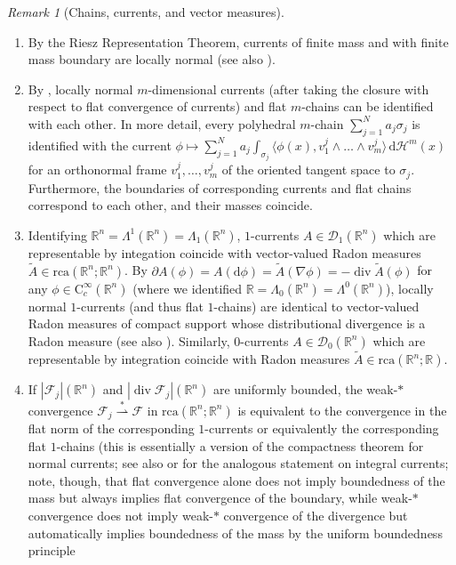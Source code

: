 \documentclass[10pt,a4paper,oneside,final]{article}
\newcommand{\R}{{\mathbb{R}}}
\newcommand{\de}{{\mathrm{d}}}
\DeclareMathOperator{\dv}{div}
\newcommand{\hd}{\mathcal{H}}
\newcommand{\rca}{\mathrm{rca}}
\newcommand{\currents}[1]{{\mathcal{D}_{#1}}}
\newcommand{\weakstarto}{\stackrel{*}{\rightharpoonup}}
\newcommand{\cont}{{\mathrm{C}}}
\newcommand{\contsmooth}{\cont_{c}^{\infty}}
\newcommand{\flux}{{\mathcal{F}}}
\numberwithin{equation}{section}
\theoremstyle{plain}
\theoremstyle{definition}
\theoremstyle{remark}
\newtheorem{remark}[theorem]{Remark}
\begin{document}
\begin{remark}[Chains, currents, and vector measures]\label{rem:chainsRCA}\mbox{}
\begin{enumerate}
\item By the Riesz Representation Theorem, currents of finite mass and with finite mass boundary are locally normal (see also \cite[26.7]{Si83}).
\item By \cite[4.1.23 \& 4.2.23]{Fe69}, locally normal $m$-dimensional currents (after taking the closure with respect to flat convergence of currents) and flat $m$-chains can be identified with each other.
In more detail, every polyhedral $m$-chain $\sum_{j=1}^Na_j\sigma_j$ is identified with the current $\phi\mapsto\sum_{j=1}^Na_j\int_{\sigma_j}\langle\phi(x),v_1^j\wedge\ldots\wedge v_m^j\rangle\,\de\hd^m(x)$
for an orthonormal frame $v_1^j,\ldots,v_m^j$ of the oriented tangent space to $\sigma_j$.
Furthermore, the boundaries of corresponding currents and flat chains correspond to each other, and their masses coincide.
\item Identifying $\R^n=\Lambda^1(\R^n)=\Lambda_1(\R^n)$, $1$-currents $A\in\currents1(\R^n)$ which are representable by integation coincide with vector-valued Radon measures $\tilde A\in\rca(\R^n;\R^n)$.
By $\partial A(\phi)=A(\de\phi)=\tilde A(\nabla\phi)=-\dv\tilde A(\phi)$ for any $\phi\in\contsmooth(\R^n)$ (where we identified $\R=\Lambda_0(\R^n)=\Lambda^0(\R^n)$),
locally normal $1$-currents (and thus flat $1$-chains) are identical to vector-valued Radon measures of compact support whose distributional divergence is a Radon measure (see also \cite[Sec.\,5]{Si07}).
Similarly, $0$-currents $A\in\currents0(\R^n)$ which are representable by integration coincide with Radon measures $\tilde A\in\rca(\R^n;\R)$.
\item If $|\flux_j|(\R^n)$ and $|\dv\flux_j|(\R^n)$ are uniformly bounded, the weak-$*$ convergence $\flux_j\weakstarto\flux$ in $\rca(\R^n;\R^n)$ is equivalent
to the convergence in the flat norm of the corresponding $1$-currents or equivalently the corresponding flat $1$-chains
(this is essentially a version of the compactness theorem for normal currents; see also \cite[Rem.\,2.2]{Xia-Interior-Regularity} or \cite[Thm.\,31.2]{Si83} for the analogous statement on integral currents;
note, though, that flat convergence alone does not imply boundedness of the mass but always implies flat convergence of the boundary,
while weak-$*$ convergence does not imply weak-$*$ convergence of the divergence but automatically implies boundedness of the mass by the uniform boundedness principle%

\end{enumerate}
\end{remark}
\end{document}
